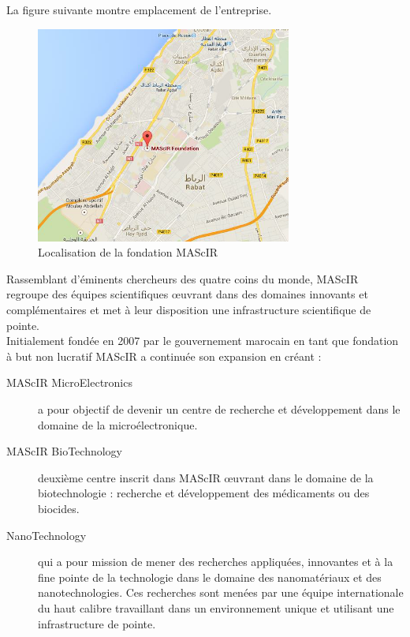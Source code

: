 \documentclass[11pt, a4paper, twoside]{book}
\begin{document}
La figure suivante montre emplacement de l’entreprise.

\begin{figure}[h]
\centering
\includegraphics[width=0.75\textwidth]{mascir_map}
\caption{Localisation de la fondation MAScIR}
\end{figure}

Rassemblant d’éminents chercheurs des quatre coins du monde, MAScIR regroupe des équipes scientifiques œuvrant dans des domaines innovants et complémentaires et met à leur disposition une infrastructure scientifique de pointe.\\

Initialement fondée en 2007 par le gouvernement marocain en tant que fondation à but non lucratif MAScIR a continuée son expansion en créant :

\begin{description}
\item[MAScIR MicroElectronics] a pour objectif de devenir un centre de recherche et développement dans le domaine de la microélectronique.
\item[MAScIR BioTechnology] deuxième centre inscrit dans MAScIR œuvrant dans le domaine de la biotechnologie : recherche et développement des médicaments ou des biocides.
\item[NanoTechnology] qui a pour mission de mener des recherches appliquées, innovantes et à la fine pointe de la technologie dans le domaine des nanomatériaux et des nanotechnologies. Ces recherches sont menées par une équipe internationale du haut calibre travaillant dans un environnement unique et utilisant une infrastructure de pointe.
\end{description}
\end{document}
